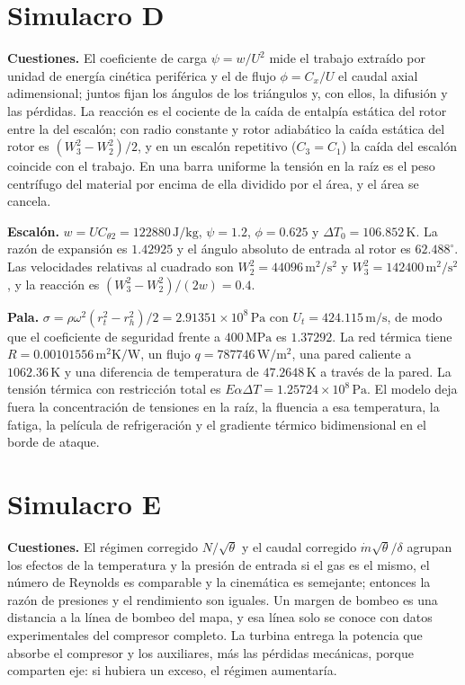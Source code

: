 \section{Simulacro D}
\textbf{Cuestiones.} El coeficiente de carga $\psi=w/U^2$ mide el trabajo extraído por unidad de energía cinética periférica y el de flujo $\phi=C_x/U$ el caudal axial adimensional; juntos fijan los ángulos de los triángulos y, con ellos, la difusión y las pérdidas. La reacción es el cociente de la caída de entalpía estática del rotor entre la del escalón; con radio constante y rotor adiabático la caída estática del rotor es $(W_3^2-W_2^2)/2$, y en un escalón repetitivo ($C_3=C_1$) la caída del escalón coincide con el trabajo. En una barra uniforme la tensión en la raíz es el peso centrífugo del material por encima de ella dividido por el área, y el área se cancela.

\textbf{Escalón.} $w=UC_{\theta2}=122880\,\mathrm{J/kg}$, $\psi=1.2$, $\phi=0.625$ y $\Delta T_0=106.852\,\mathrm K$. La razón de expansión es $1.42925$ y el ángulo absoluto de entrada al rotor es $62.488^\circ$. Las velocidades relativas al cuadrado son $W_2^2=44096\,\mathrm{m^2/s^2}$ y $W_3^2=142400\,\mathrm{m^2/s^2}$, y la reacción es $(W_3^2-W_2^2)/(2w)=0.4$.

\textbf{Pala.} $\sigma=\rho\omega^2(r_t^2-r_h^2)/2=2.91351\times10^{8}\,\mathrm{Pa}$ con $U_t=424.115\,\mathrm{m/s}$, de modo que el coeficiente de seguridad frente a $400\,\mathrm{MPa}$ es $1.37292$. La red térmica tiene $R=0.00101556\,\mathrm{m^2K/W}$, un flujo $q=787746\,\mathrm{W/m^2}$, una pared caliente a $1062.36\,\mathrm K$ y una diferencia de temperatura de $47.2648\,\mathrm K$ a través de la pared. La tensión térmica con restricción total es $E\alpha\Delta T=1.25724\times10^{8}\,\mathrm{Pa}$. El modelo deja fuera la concentración de tensiones en la raíz, la fluencia a esa temperatura, la fatiga, la película de refrigeración y el gradiente térmico bidimensional en el borde de ataque.



\section{Simulacro E}
\textbf{Cuestiones.} El régimen corregido $N/\sqrt\theta$ y el caudal corregido $\dot m\sqrt\theta/\delta$ agrupan los efectos de la temperatura y la presión de entrada si el gas es el mismo, el número de Reynolds es comparable y la cinemática es semejante; entonces la razón de presiones y el rendimiento son iguales. Un margen de bombeo es una distancia a la línea de bombeo del mapa, y esa línea solo se conoce con datos experimentales del compresor completo. La turbina entrega la potencia que absorbe el compresor y los auxiliares, más las pérdidas mecánicas, porque comparten eje: si hubiera un exceso, el régimen aumentaría.

